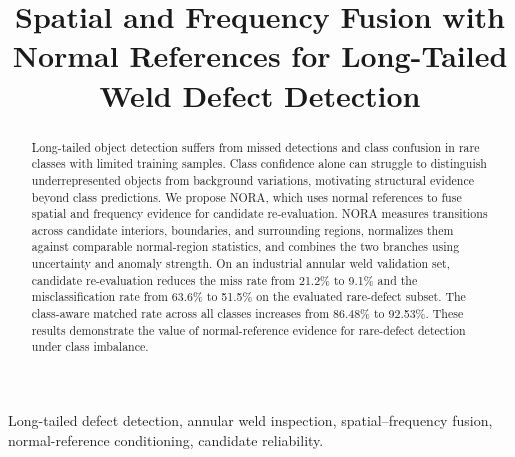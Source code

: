 \documentclass{article}
\title{Spatial and Frequency Fusion with Normal References for Long-Tailed Weld Defect Detection}
\begin{document}
\ninept
\maketitle

\begin{abstract}
Long-tailed object detection suffers from missed detections and class confusion in rare classes with limited training samples. Class confidence alone can struggle to distinguish underrepresented objects from background variations, motivating structural evidence beyond class predictions. We propose NORA, which uses normal references to fuse spatial and frequency evidence for candidate re-evaluation. NORA measures transitions across candidate interiors, boundaries, and surrounding regions, normalizes them against comparable normal-region statistics, and combines the two branches using uncertainty and anomaly strength. On an industrial annular weld validation set, candidate re-evaluation reduces the miss rate from 21.2\% to 9.1\% and the misclassification rate from 63.6\% to 51.5\% on the evaluated rare-defect subset. The class-aware matched rate across all classes increases from 86.48\% to 92.53\%. These results demonstrate the value of normal-reference evidence for rare-defect detection under class imbalance.
\end{abstract}

\begin{keywords}
Long-tailed defect detection, annular weld inspection, spatial--frequency fusion, normal-reference conditioning, candidate reliability.
\end{keywords}







\clearpage
\raggedbottom


\end{document}
